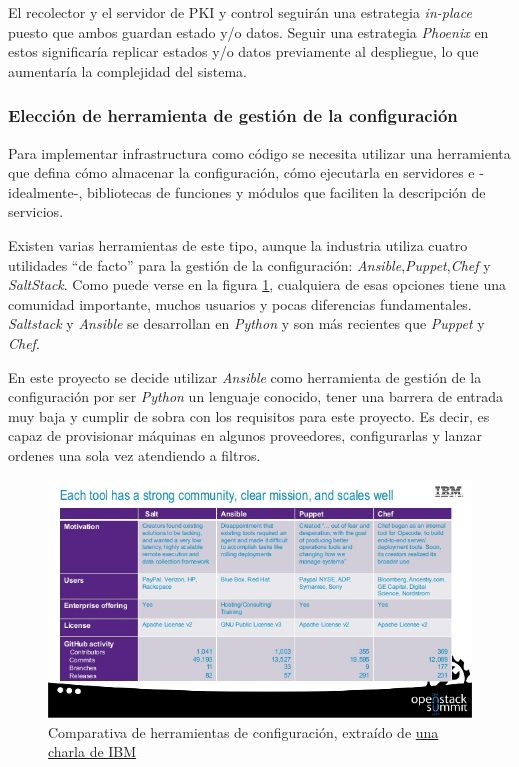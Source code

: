 El recolector y el servidor de PKI y control seguirán una estrategia \emph{in-place} puesto que ambos guardan estado y/o datos. Seguir una estrategia \emph{Phoenix} en estos
significaría replicar estados y/o datos previamente al despliegue, lo que aumentaría la complejidad del sistema.

\subsubsection{Elección de herramienta de gestión de la configuración}

Para implementar infrastructura como código se necesita utilizar una herramienta que defina cómo almacenar la configuración,
cómo ejecutarla en servidores e -idealmente-, bibliotecas de funciones y módulos que faciliten la descripción de servicios.

Existen varias herramientas de este tipo, aunque la industria utiliza cuatro utilidades ``de facto'' para la gestión de la configuración: \emph{Ansible},\emph{Puppet},\emph{Chef}
y  \emph{SaltStack}. Como puede verse en la figura \ref{fig:configmanagement1}, cualquiera de esas opciones tiene una comunidad importante, muchos usuarios y pocas diferencias
fundamentales. \emph{Saltstack} y \emph{Ansible} se desarrollan en \emph{Python} y son más recientes que \emph{Puppet} y \emph{Chef}.

En este proyecto se decide utilizar \emph{Ansible} como herramienta de gestión de la configuración por ser \emph{Python} un lenguaje conocido, tener una barrera de entrada muy baja
y cumplir de sobra con los requisitos para este proyecto. Es decir, es capaz de provisionar máquinas en algunos proveedores, configurarlas y lanzar ordenes una sola vez atendiendo a filtros.

\begin{figure}[h]
    \centering
      \includegraphics[scale=0.5]{images/configmanagement_tools1}
    \caption{Comparativa de herramientas de configuración, extraído de \href{https://www.slideshare.net/DanielKrook/caps-whats-best-for-deploying-and-managing-openstack-chef-vs-ansible-vs-puppet-vs-salt}{una charla de IBM}}
    \label{fig:configmanagement1}
  \end{figure}

